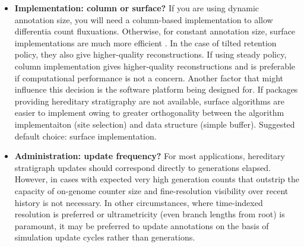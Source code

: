 \begin{enumerate}
\begin{itemize}
  According to results here, simulation scale does not appear to be a major factor in considering annotation size, because at the same absolute sample sizes samples from differently sized populations have no clear trend in reconstruction quality characteristics.
  However, sample size may play into decision of annotation size (see below).

  Note that in addition to differentia values, a generation counter will also need to be stored in genomes (for most use cases, a 32- or 64-bit value).

  In scenarios where explicitly differentiating between founding clades is paramount, consider adding a systematically assigned founder ID or randomly generated fixed tag.
  This tag would then be as a first pass to divvy end genomes between founding origins before feeding into the rest of the reconstruction pipeline.
  \footnote{One possible exception is cases where a global monotonic counter is available and it is desirable to demarcate phylogenetic history in terms of simulation time rather than generations.}
\item \textbf{Implementation: column or surface?}
  If you are using dynamic annotation size, you will need a column-based implementation to allow differentia count fluxuations.
  Otherwise, for constant annotation size, surface implementations are much more efficient \citep{TODOOTHERPAPER}.
  In the case of tilted retention policy, they also give higher-quality reconstructions.
  If using steady policy, column implementation gives higher-quality reconstructions and is preferable if computational performance is not a concern.
  Another factor that might influence this decision is the software platform being designed for.
  If packages providing hereditary stratigraphy are not available, surface algorithms are easier to implement owing to greater orthogonality between the algorithm implementaiton (site selection) and data structure (simple buffer).
  Suggested default choice: surface implementation.
\item \textbf{Administration: update frequency?}
  For most applications, hereditary stratigraph updates should correspond directly to generations elapsed.
  However, in cases with expected very high generation counts that outstrip the capacity of on-genome counter size and fine-resolution visibility over recent history is not necessary.
  In other circumstances, where time-indexed resolution is preferred or ultrametricity (even branch lengths from root) is paramount, it may be preferred to update annotations on the basis of simulation update cycles rather than generations.

\end{itemize}
\end{enumerate}
